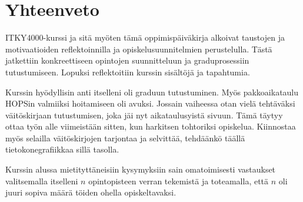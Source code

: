 \documentclass[utf8]{gradu3}
\begin{document}
\chapter{Yhteenveto}
\label{yhteenveto}

ITKY4000-kurssi ja sitä myöten tämä oppimispäiväkirja alkoivat taustojen ja
motivaatioiden reflektoinnilla ja opiskelusuunnitelmien perustelulla. Tästä
jatkettiin konkreettiseen opintojen suunnitteluun ja graduprosessiin
tutustumiseen. Lopuksi reflektoitiin kurssin sisältöjä ja tapahtumia.

Kurssin hyödyllisin anti itselleni oli graduun tutustuminen. Myös
pakkoaikataulu HOPSin valmiiksi hoitamiseen oli avuksi. Jossain vaiheessa
otan vielä tehtäväksi väitöskirjaan tutustumisen, joka jäi nyt
aikataulusyistä sivuun. Tämä täytyy ottaa työn alle viimeistään sitten, kun
harkitsen tohtoriksi opiskelua. Kiinnostaa myös selailla väitöskirjojen
tarjontaa ja selvittää, tehdäänkö täällä tietokonegrafiikkaa sillä tasolla.

Kurssin alussa mietityttäneisiin kysymyksiin sain omatoimisesti vastaukset
valitsemalla itselleni $n$ opintopisteen verran tekemistä ja toteamalla, että
$n$ oli juuri sopiva määrä töiden ohella opiskeltavaksi.

\printbibliography
\end{document}
